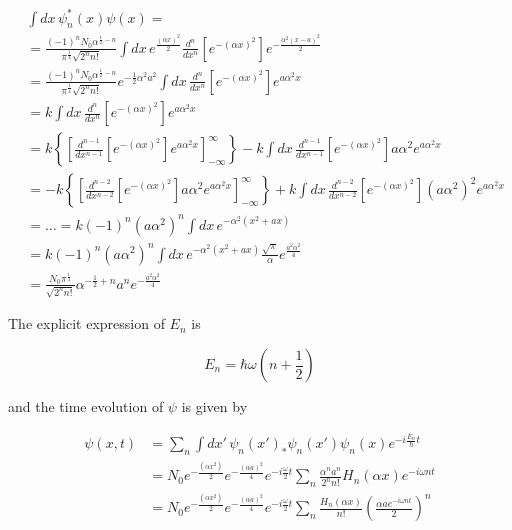 \documentclass{article}
\begin{document}
\begin{align}
\label{eq:cn}
& \int dx \, \psi_n^*(x) \psi(x) = \nonumber \\
& = \frac{(-1)^n N_0 \alpha^{\frac{1}{2} - n}}{\pi^{\frac{1}{4}} \sqrt{2^n n!}} \int dx \, e^{\frac{(\alpha x)^2}{2}} \frac{d^n}{dx^n} \left[ e^{-(\alpha x)^2} \right] e^{-\frac{\alpha^2(x-a)^2}{2}} \nonumber \\
& = \frac{(-1)^n N_0 \alpha^{\frac{1}{2} - n}}{\pi^{\frac{1}{4}} \sqrt{2^n n!}} e^{-\frac{1}{2} \alpha^2 a^2} \int dx \, \frac{d^n}{dx^n} \left[ e^{-(\alpha x)^2} \right] e^{a \alpha^2 x} \nonumber \\
& = k \int dx \, \frac{d^n}{dx^n} \left[ e^{-(\alpha x)^2} \right] e^{a \alpha^2 x} \nonumber \\
& = k \left\{ \left[ \frac{d^{n-1}}{dx^{n-1}} \left[ e^{-(\alpha x)^2} \right] e^{a\alpha^2x} \right]_{-\infty}^{\infty} \right\} - k \int dx \, \frac{d^{n-1}}{dx^{n-1}} \left[ e^{-(\alpha x)^2} \right] a \alpha^2 e^{a \alpha^2 x} \nonumber \\
& = - k \left\{ \left[ \frac{d^{n-2}}{dx^{n-2}} \left[ e^{-(\alpha x)^2} \right] a \alpha^2 e^{a\alpha^2x} \right]_{-\infty}^{\infty} \right\} + k \int dx \, \frac{d^{n-2}}{dx^{n-2}} \left[ e^{-(\alpha x)^2} \right] (a \alpha^2)^2 e^{a \alpha^2 x} \nonumber \\
& = \ldots = k (-1)^n (a \alpha^2)^n \int dx \, e^{-\alpha^2 (x^2 + ax)} \nonumber \\
& = k (-1)^n (a \alpha^2)^n \int dx \, e^{-\alpha^2 (x^2 + ax)} \frac{\sqrt{\pi}}{\alpha} e^{\frac{a^2 \alpha^2}{4}} \nonumber \\
& = \frac{N_0 \pi^{\frac{1}{4}}}{\sqrt{2^n n!}} \alpha^{-\frac{1}{2}+n} a^n e^{-\frac{a^2 \alpha^2}{4}}
\end{align}

The explicit expression of \( E_n \) is

\begin{equation}
E_n = \hbar \omega \left( n + \frac{1}{2} \right)
\end{equation}

and the time evolution of \( \psi \) is given by

\begin{align}
\psi(x,t) & = \sum_n \int dx' \, \psi_n(x')_* \psi_n(x') \psi_n(x) e^{-i \frac{E_n}{\hbar}t} \nonumber \\
& = N_0 e^{-\frac{(\alpha x^2)}{2}} e^{-\frac{(\alpha a)^2}{4}} e^{-i \frac{\omega}{2} t} \sum_n \frac{\alpha^n a^n}{2^n n!} H_n(\alpha x) e^{-i \omega n t} \nonumber \\
& = N_0 e^{-\frac{(\alpha x^2)}{2}} e^{-\frac{(\alpha a)^2}{4}} e^{-i \frac{\omega}{2} t} \sum_n \frac{H_n(\alpha x)}{n!} \left( \frac{\alpha a e^{-i \omega n t}}{2} \right)^n
\end{align}
\end{document}
